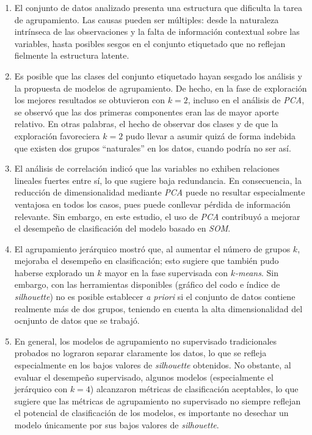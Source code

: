 \documentclass[12pt,a4paper]{article}
\begin{document}
\begin{enumerate}
  \item El conjunto de datos analizado presenta una estructura que dificulta la tarea de agrupamiento. Las causas 
  pueden ser múltiples: desde la naturaleza intrínseca de las observaciones y la falta de información contextual 
  sobre las variables, hasta posibles sesgos en el conjunto etiquetado que no reflejan fielmente la estructura latente.

  \item Es posible que las clases del conjunto etiquetado hayan sesgado los análisis y la propuesta de modelos de 
  agrupamiento. De hecho, en la fase de exploración los mejores resultados se obtuvieron con \(k=2\), incluso en el 
  análisis de \emph{PCA}, se observó que las dos primeras componentes eran las de mayor aporte relativo. En otras 
  palabras, el hecho de observar dos clases y de que la exploración favoreciera \(k=2\) pudo llevar a asumir quizá de 
  forma indebida que existen dos grupos “naturales” en los datos, cuando podría no ser así.

  \item El análisis de correlación indicó que las variables no exhiben relaciones lineales fuertes entre sí, lo 
  que sugiere baja redundancia. En consecuencia, la reducción de dimensionalidad mediante \emph{PCA} puede no resultar  
  especialmente ventajosa en todos los casos, pues puede conllevar pérdida de información relevante. Sin embargo, en este 
  estudio, el uso de \emph{PCA} contribuyó a mejorar el desempeño de clasificación del modelo basado en \emph{SOM}.

  \item El agrupamiento jerárquico mostró que, al aumentar el número de grupos \(k\), mejoraba el desempeño en 
  clasificación; esto sugiere que también pudo haberse explorado un \(k\) mayor en la fase supervisada con 
  \emph{\(k\)-means}. Sin embargo, con las herramientas disponibles (gráfico del codo e índice de \emph{silhouette}) 
  no es posible establecer \emph{a priori} si el conjunto de datos contiene realmente más de dos grupos, teniendo en cuenta 
  la alta dimensionalidad del ocnjunto de datos que se trabajó.

  \item En general, los modelos de agrupamiento no supervisado tradicionales probados no lograron separar claramente los datos, lo que 
  se refleja especialmente en los bajos valores de \emph{silhouette} obtenidos. No obstante, al evaluar el desempeño 
  supervisado, algunos modelos (especialmente el jerárquico con \(k=4\)) alcanzaron métricas de clasificación aceptables, 
  lo que sugiere que las métricas de agrupamiento no supervisado no siempre reflejan el potencial de clasificación de 
  los modelos, es importante no desechar un modelo únicamente por sus bajos valores de \emph{silhouette}.

\end{enumerate}
\end{document}
